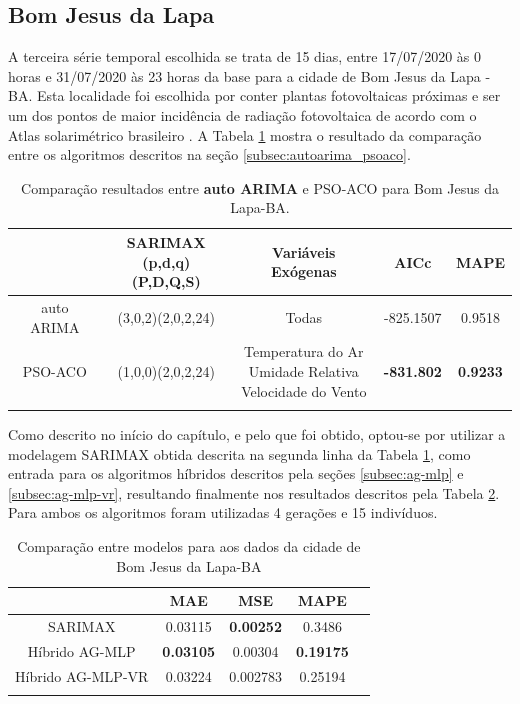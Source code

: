 \subsection{Bom Jesus da Lapa}

A terceira série temporal escolhida se trata de 15 dias, entre 17/07/2020 às 0 horas e 31/07/2020 às 23 horas da base para a cidade de Bom Jesus da Lapa - BA. Esta localidade foi escolhida por conter plantas fotovoltaicas próximas e ser um dos pontos de maior incidência de radiação fotovoltaica de acordo com o Atlas solarimétrico brasileiro \cite{pereira2017atlas}. A Tabela \ref{tab:cap4_comp_bjl_autoarima_psoaco} mostra o resultado da comparação entre os algoritmos descritos na seção \ref{subsec:autoarima_psoaco}.

\begin{table}[htbp]
\caption{Comparação resultados entre \textbf{auto ARIMA} e PSO-ACO para Bom Jesus da Lapa-BA.}
\begin{center}
\begin{tabular}{ccccc}
                    & \Longstack{SARIMAX \\ (p,d,q)(P,D,Q,S)} & Variáveis Exógenas & AICc & MAPE  \\\hline
auto ARIMA & (3,0,2)(2,0,2,24) & Todas & -825.1507 & 0.9518 \\\hline
PSO-ACO             & (1,0,0)(2,0,2,24) & \Longstack{Temperatura do Ar \\ Umidade Relativa \\ Velocidade do Vento} & \textbf{-831.802} & \textbf{0.9233} \\\hline
\label{tab:cap4_comp_bjl_autoarima_psoaco}
\end{tabular}
\end{center}
\end{table}

Como descrito no início do capítulo, e pelo que foi obtido, optou-se por utilizar a modelagem SARIMAX obtida descrita na segunda linha da Tabela \ref{tab:cap4_comp_bjl_autoarima_psoaco}, como entrada para os algoritmos híbridos descritos pela seções \ref{subsec:ag-mlp} e \ref{subsec:ag-mlp-vr}, resultando finalmente nos resultados descritos pela Tabela \ref{tab:cap4_comp_bjl_agmlp_agmlpvr}. Para ambos os algoritmos foram utilizadas 4 gerações e 15 indivíduos.

\begin{table}[htbp]
\caption{Comparação entre modelos para aos dados da cidade de Bom Jesus da Lapa-BA}
\begin{center}
\begin{tabular}{ccccc}
                & MAE & MSE & MAPE \\\hline
SARIMAX         & 0.03115 & \textbf{0.00252} & 0.3486 \\\hline
Híbrido AG-MLP  & \textbf{0.03105} & 0.00304 & \textbf{0.19175} \\\hline
Híbrido AG-MLP-VR & 0.03224 & 0.002783 & 0.25194 \\\hline
\label{tab:cap4_comp_bjl_agmlp_agmlpvr}
\end{tabular}
\end{center}
\end{table}

